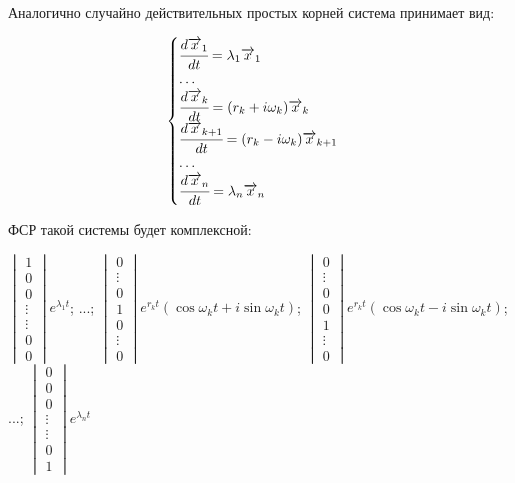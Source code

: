 Аналогично случайно действительных простых корней система принимает вид: 

\[ \begin{cases}
    \cfrac{d \overrightarrow{x}_1}{dt} = \lambda_1 \overrightarrow{x}_1 \\ 
    \ldots \\
    \cfrac{d \overrightarrow{x}_k}{dt} = (r_k + i \omega_k)\overrightarrow{x}_k \\
    \cfrac{d \overrightarrow{x}_{k+1}}{dt} = (r_k - i \omega_k)\overrightarrow{x}_{k+1} \\
    \ldots \\
    \cfrac{d \overrightarrow{x}_n}{dt} = \lambda_n \overrightarrow{x}_n
\end{cases}\]

ФСР такой системы будет комплексной:

$\begin{vmatrix*} 1 \\ 0 \\ 0 \\ \vdots \\ \vdots \\ 0 \\ 0 \end{vmatrix*} e^{\lambda_1 t}$; ...; 
$\begin{vmatrix*} 0 \\ \vdots \\ 0 \\ 1 \\ 0 \\ \vdots \\ 0 \end{vmatrix*} e^{r_k t} (\cos \omega_k t + i \sin \omega_k t)$;
$\begin{vmatrix*} 0 \\ \vdots \\ 0 \\ 0 \\ 1 \\ \vdots \\ 0 \end{vmatrix*} e^{r_k t} (\cos \omega_k t - i \sin \omega_k t)$; ...; 
$\begin{vmatrix*} 0 \\ 0 \\ 0 \\ \vdots \\ \vdots \\ 0 \\ 1 \end{vmatrix*} e^{\lambda_n t}$


